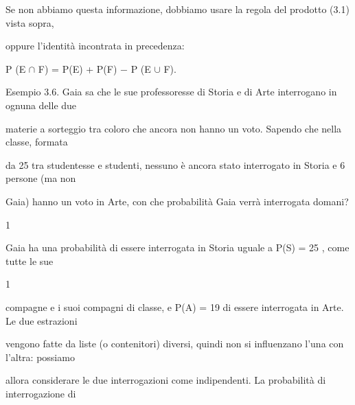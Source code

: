 \documentclass[a4paper,portrait,12pt]{article}
\begin{document}
\begin{flushleft}
Se non abbiamo questa informazione, dobbiamo usare la regola del prodotto (3.1) vista sopra,
\end{flushleft}


\begin{flushleft}
oppure l'identit\`{a} incontrata in precedenza:
\end{flushleft}


\begin{flushleft}
P (E $\cap$ F) = P(E) + P(F) $-$ P (E $\cup$ F).
\end{flushleft}


\begin{flushleft}
Esempio 3.6. Gaia sa che le sue professoresse di Storia e di Arte interrogano in ognuna delle due
\end{flushleft}


\begin{flushleft}
materie a sorteggio tra coloro che ancora non hanno un voto. Sapendo che nella classe, formata
\end{flushleft}


\begin{flushleft}
da 25 tra studentesse e studenti, nessuno \`{e} ancora stato interrogato in Storia e 6 persone (ma non
\end{flushleft}


\begin{flushleft}
Gaia) hanno un voto in Arte, con che probabilit\`{a} Gaia verr\`{a} interrogata domani?
\end{flushleft}


1


\begin{flushleft}
Gaia ha una probabilit\`{a} di essere interrogata in Storia uguale a P(S) = 25 , come tutte le sue
\end{flushleft}


1


\begin{flushleft}
compagne e i suoi compagni di classe, e P(A) = 19 di essere interrogata in Arte. Le due estrazioni
\end{flushleft}


\begin{flushleft}
vengono fatte da liste (o contenitori) diversi, quindi non si influenzano l'una con l'altra: possiamo
\end{flushleft}


\begin{flushleft}
allora considerare le due interrogazioni come indipendenti. La probabilit\`{a} di interrogazione di
\end{flushleft}
\end{document}
